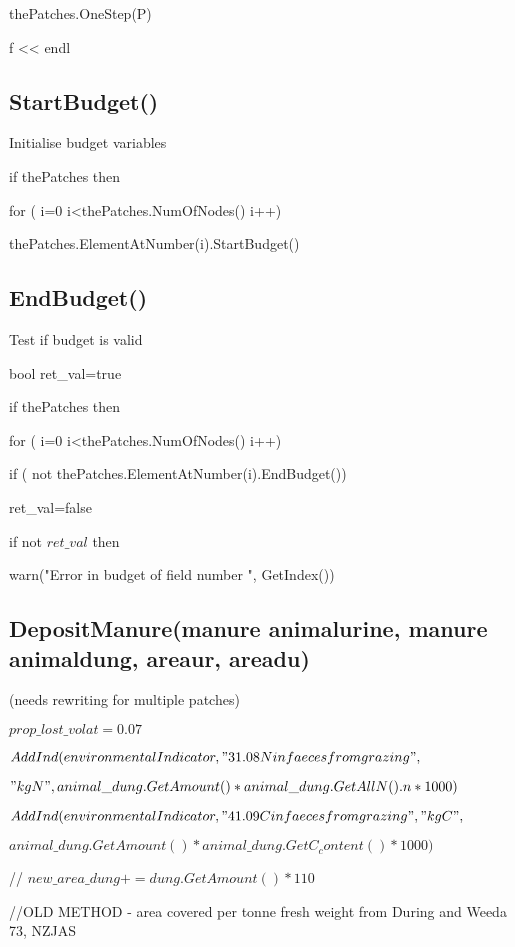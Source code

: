 \documentclass[%
]{scrartcl}
\begin{document}
{{   \quad   \quad   thePatches.OneStep(P)

 \quad   f << endl



\subsection{StartBudget()}
Initialise budget variables

	if thePatches then
	
   	  \quad for ( i=0 i<thePatches.NumOfNodes() i++)
   	
     \quad  \quad		thePatches.ElementAtNumber(i).StartBudget()


\subsection{EndBudget()}
Test if budget is valid

	bool ret\_val=true
	
   if thePatches then
   
  \quad  	for ( i=0 i<thePatches.NumOfNodes() i++)
   	
\quad \quad \quad 	   	if ( not thePatches.ElementAtNumber(i).EndBudget())

\quad \quad  ret\_val=false
	   	
  \quad \quad  if  not $ret\_val$ then
   
   \quad \quad \quad  warn("Error in budget of field number ", GetIndex())




\subsection{DepositManure(manure animalurine,
 manure animaldung, areaur, areadu)}
(needs rewriting for multiple patches)

	$prop\_lost\_volat=0.07$

 $  AddInd(environmentalIndicator,
"31.08 N in faeces from grazing",$

$"kg N",
animal\_dung.GetAmount()*animal\_dung.GetAllN().n*1000)$
  
 $  AddInd(environmentalIndicator,
"41.09 C in faeces from grazing","kg C",$


$animal\_dung.GetAmount()*animal\_dung.GetC_content()*1000)$

// $new\_area\_dung+=dung.GetAmount()*110$ 

  //OLD METHOD - area covered per tonne fresh weight from During and Weeda 73, NZJAS

}}
\end{document}
